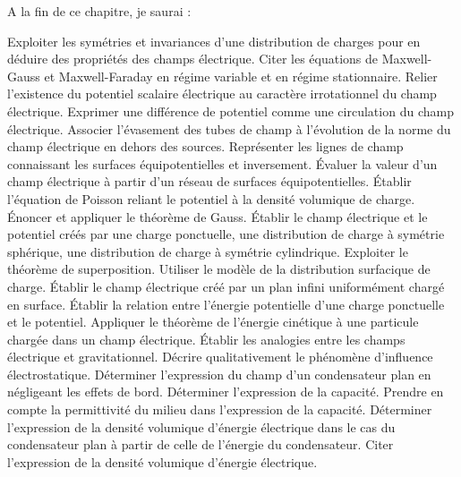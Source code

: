 A la fin de ce chapitre, je saurai :
\begin{competences}
  \point Exploiter les symétries et invariances d'une distribution de charges pour en
  déduire des propriétés des champs électrique.
  \point Citer les équations de Maxwell-Gauss et Maxwell-Faraday en régime variable et en régime stationnaire.
  \point Relier l'existence du potentiel scalaire électrique au caractère irrotationnel du champ électrique.
  \point Exprimer une différence de potentiel comme une circulation du champ électrique.
  \point Associer l’évasement des tubes de champ à l’évolution de la norme du champ électrique en dehors des sources.
  \point Représenter les lignes de champ connaissant les surfaces équipotentielles et inversement.
  \point Évaluer la valeur d’un champ électrique à partir d’un réseau de surfaces équipotentielles.
  \point Établir l’équation de Poisson reliant le potentiel à la 
  densité volumique de charge.
  \point Énoncer et appliquer le théorème de Gauss.
  \point Établir le champ électrique et le potentiel créés par une charge ponctuelle, une distribution de charge à symétrie sphérique, une distribution de charge à symétrie cylindrique.
  \point Exploiter le théorème de superposition.
  \point Utiliser le modèle de la distribution surfacique de charge.
  \point Établir le champ électrique créé par un plan infini uniformément chargé en surface.
  \point Établir la relation entre l’énergie potentielle d’une charge ponctuelle et le potentiel.
  \point Appliquer le théorème de l’énergie cinétique à une particule chargée dans un champ électrique.
  \point Établir les analogies entre les champs électrique et gravitationnel.
  \point \faSignLanguage Décrire qualitativement le phénomène d'influence électrostatique.
  \point Déterminer l’expression du champ d’un condensateur plan en négligeant les effets de bord.
  \point Déterminer l'expression de la capacité.
  \point Prendre en compte la permittivité du milieu dans l’expression de la capacité.
  \point Déterminer l’expression de la densité volumique d’énergie électrique dans le cas du condensateur plan à partir de celle de l’énergie du condensateur.
  \point Citer l'expression de la densité volumique d'énergie électrique.
\end{competences}
